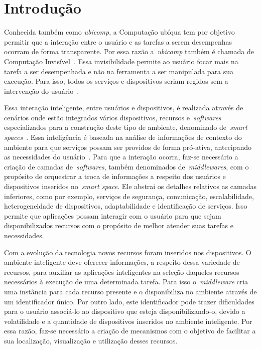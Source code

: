 \chapter{Introdução} 


	
	Conhecida também como \textit{ubicomp}, a Computação ubíqua tem por objetivo permitir  
	que a interação entre o usuário e as tarefas a 
	serem desempenhas ocorram de forma transparente. Por essa razão
	a~\textit{ubicomp} também é chamada de Computação Invisível~\cite{markHotTopics,markWorld,rawesak}. 
	Essa invisibilidade permite ao usuário focar mais na tarefa a ser desempenhada e não na 
	ferramenta a ser manipulada para sua execução. Para isso, todos os serviços e dispositivos 
	seriam regidos sem a intervenção do usuário~\cite{mark21Century}. 
	
	Essa interação inteligente, entre usuários e dispositivos, é realizada através de cenários onde 
	estão integrados vários dispositivos, recursos e~\textit{softwares} especializados para a 
	construção deste tipo de ambiente, denominado de~\textit{smart spaces}~\cite{ubiSmartSpace}. 
	Essa inteligência é baseada na análise de informações de contexto do ambiente para que serviços
	possam ser providos de forma pró-ativa, antecipando as necessidades do usuário~\cite{paulDourish}. Para que a 
	interação ocorra, faz-se necessário a criação de camadas de~\textit{softwares}, também denominados 
	de~\textit{middlewares}, com o propósito de orquestrar a troca de informações a respeito dos 
	usuários e dispositivos inseridos no~\textit{smart space}. Ele abstrai os detalhes
	relativos as camadas inferiores, como por exemplo, serviços de segurança, comunicação, escalabilidade, 
	heterogeneidade de dispositivos, adaptabilidade e identificação de serviços. Isso permite que 
	aplicações possam interagir com o usuário para que sejam disponibilizados recursos com o propósito
	de melhor atender suas tarefas e necessidades.
	
	Com a evolução da tecnologia novos recursos foram inseridos nos dispositivos. O ambiente inteligente deve
	oferecer informações, a respeito dessa variedade de recursos, para auxiliar as aplicações inteligentes 
	na seleção daqueles recursos necessários à execução de uma determinada tarefa. Para isso o~\textit{middleware}
	cria uma instância para cada recurso presente e o disponibiliza  no ambiente através de um identificador
	único. Por outro lado, este identificador pode trazer dificuldades para o usuário associá-lo ao dispositivo
	que esteja disponibilizando-o, devido a volatilidade e a quantidade de dispositivos inseridos no ambiente 
	inteligente. Por essa razão, faz-se necessário a criação de mecanismos com o objetivo de facilitar a sua 
	localização, visualização e utilização desses recursos. 
	
